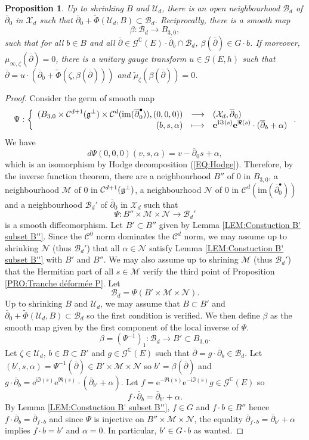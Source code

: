 \documentclass{article}
\newtheorem{proposition}[theorem]{Proposition}
\theoremstyle{remark}
\theoremstyle{definition}
\newcommand{\C}{\mathbb{C}}
\newcommand{\im}{\mathrm{im}}
\renewcommand{\i}{\boldsymbol{\mathrm{i}}}
\newcommand{\e}{\boldsymbol{\mathrm{e}}}
\newcommand{\G}{\mathcal{G}}
\newcommand{\mB}{\mathcal{B}}
\newcommand{\mC}{\mathcal{C}}
\newcommand{\mX}{\mathcal{X}}
\newcommand{\mU}{\mathcal{U}}
\newcommand{\dbar}{\overline{\partial}}
\newcommand{\fonction}[4]{\left\{ \begin{array}{rcl}
		\displaystyle #1 & \longrightarrow & \displaystyle #2\\
		\displaystyle #3 & \longmapsto & \displaystyle #4
	\end{array} \right.}
\begin{document}
\begin{proposition}\label{PRO:Zéro dans la tranche déformée}
    Up to shrinking $B$ and $\mU_d$, there is an open neighbourhood $\mB_d$ of $\dbar_0$ in $\mX_d$ such that $\dbar_0 + \tilde{\Phi}(\mU_d,B) \subset \mB_d$. Reciprocally, there is a smooth map
    $$
    \beta : \mB_d \rightarrow B_{3,0},
    $$
    such that for all $b \in B$ and all $\dbar \in \G^\C(E) \cdot \dbar_b \cap \mB_d$, $\beta(\dbar) \in G \cdot b$. If moreover, $\mu_{\infty,\zeta}(\dbar) = 0$, there is a unitary gauge transform $u \in \G(E,h)$ such that $\dbar = u \cdot (\dbar_0 + \tilde{\Phi}(\zeta,\beta(\dbar)))$ and $\tilde{\mu}_\zeta(\beta(\dbar)) = 0$.
\end{proposition}
\begin{proof}
Consider the germ of smooth map
$$
\Psi : \fonction{(B_{3,0} \times \mC^{d + 1}(\frak{g}^\bot) \times \mC^d(\im(\dbar_0^\bullet)),(0,0,0))}{(\mX_d,\dbar_0)}{(b,s,\alpha)}{\e^{\i\Im(s)}\e^{\Re(s)} \cdot (\dbar_b + \alpha)}.
$$
We have
$$
d\Psi(0,0,0)(v,s,\alpha) = v - \dbar_0s + \alpha,
$$
which is an isomorphism by Hodge decomposition (\ref{EQ:Hodge}). Therefore, by the inverse function theorem, there are a neighbourhood $B''$ of $0$ in $B_{3,0}$, a neighbourhood $\mathcal{M}$ of $0$ in $\mC^{d + 1}(\frak{g}^\bot)$, a neighbourhood $\mathcal{N}$ of $0$ in $\mC^d(\im(\dbar_0^\bullet))$ and a neighbourhood $\mB_d'$ of $\dbar_0$ in $\mX_d$ such that
$$
\Psi : B'' \times \mathcal{M} \times \mathcal{N} \rightarrow \mB_d'
$$
is a smooth diffeomorphism. Let $B' \subset B''$ given by Lemma \ref{LEM:Constuction B' subset B''}. Since the $\mC^0$ norm dominates the $\mC^d$ norm, we may assume up to shrinking $\mathcal{N}$ (thus $\mB_d'$) that all $\alpha \in \mathcal{N}$ satisfy Lemma \ref{LEM:Constuction B' subset B''} with $B'$ and $B''$. We may also assume up to shrining $\mathcal{M}$ (thus $\mB_d'$) that the Hermitian part of all $s \in \mathcal{M}$ verify the third point of Proposition \ref{PRO:Tranche déformée P}. Let
$$
\mB_d = \Psi(B' \times \mathcal{M} \times \mathcal{N}).
$$
Up to shrinking $B$ and $\mU_d$, we may assume that $B \subset B'$ and $\dbar_0 + \tilde{\Phi}(\mU_d,B) \subset \mB_d$ so the first condition is verified. We then define $\beta$ as the smooth map given by the first component of the local inverse of $\Psi$.
$$
\beta = (\Psi^{-1})_1 : \mB_d \rightarrow B' \subset B_{3,0}.
$$
Let $\zeta \in \mU_d$, $b \in B \subset B'$ and $g \in \G^\C(E)$ such that $\dbar = g \cdot \dbar_b \in \mB_d$. Let $(b',s,\alpha) = \Psi^{-1}(\dbar) \in B' \times \mathcal{M} \times \mathcal{N}$ so $b' = \beta(\dbar)$ and $g \cdot \dbar_b = \e^{\i\Im(s)}\e^{\Re(s)} \cdot (\dbar_{b'} + \alpha)$. Let $f = \e^{-\Re(s)}\e^{-\i\Im(s)}g \in \G^\C(E)$ so
$$
f \cdot \dbar_b = \dbar_{b'} + \alpha.
$$
By Lemma \ref{LEM:Constuction B' subset B''}, $f \in G$ and $f \cdot b \in B''$ hence $f \cdot \dbar_b = \dbar_{f \cdot b}$ and since $\Psi$ is injective on $B'' \times \mathcal{M} \times \mathcal{N}$, the equality $\dbar_{f \cdot b} = \dbar_{b'} + \alpha$ implies $f \cdot b = b'$ and $\alpha = 0$. In particular, $b' \in G \cdot b$ as wanted.


\end{proof}
\end{document}
